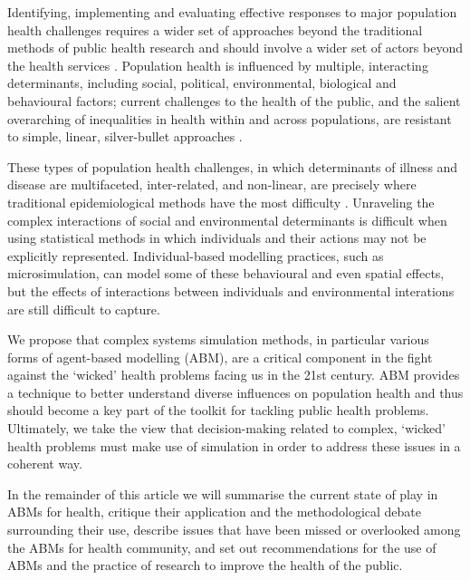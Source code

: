 \documentclass[review]{elsarticle}
\begin{document}
Identifying, implementing and evaluating effective responses to major population health challenges requires a wider set of approaches beyond the traditional methods of public health research and should involve a wider set of actors beyond the health services \citep{academy2016}. Population health is influenced by multiple, interacting determinants, including social, political, environmental, biological and behavioural factors; current challenges to the health of the public, and the salient overarching of inequalities in health within and across populations, are resistant to simple, linear, silver-bullet approaches \citep{rutter2017}.

These types of population health challenges, in which determinants of illness and disease are multifaceted, inter-related, and non-linear, are precisely where traditional epidemiological methods have the most difficulty \citep{galea2010}.  Unraveling the complex interactions of social and environmental determinants is difficult when using statistical methods in which individuals and their actions may not be explicitly represented.  Individual-based modelling practices, such as microsimulation, can model some of these behavioural and even spatial effects, but the effects of interactions between individuals and environmental interations are still difficult to capture.

We propose that complex systems simulation methods, in particular various forms of agent-based modelling (ABM), are a critical component in the fight against the `wicked' health problems facing us in the 21st century.  ABM provides a technique to better understand diverse influences on population health and thus should become a key part of the toolkit for tackling public health problems.  Ultimately, we take the view that decision-making related to complex, `wicked' health problems must make use of simulation in order to address these issues in a coherent way. 

In the remainder of this article we will summarise the current state of play in ABMs for health, critique their application and the methodological debate surrounding their use, describe issues that have been missed or overlooked among the ABMs for health community, and set out recommendations for the use of ABMs and the practice of research to improve the health of the public.

\end{document}
